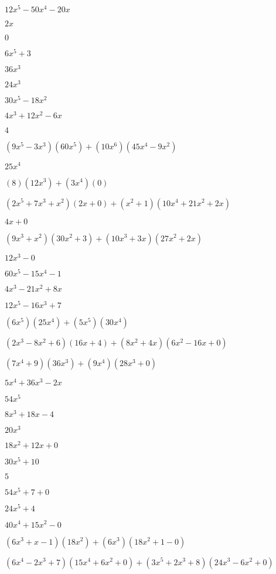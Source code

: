 \documentclass{article}
\begin{document}
\begin{multicols}{2}
$12x^{5}-50x^{4}-20x$\item $2x$\item $0$\item $6x^{5}+3$\item $36x^{3}$\item $24x^{3}$\item $30x^{5}-18x^{2}$\item $4x^{3}+12x^{2}-6x$\item $4$\item $(9x^{5}-3x^{3})(60x^{5})+(10x^{6})(45x^{4}-9x^{2})$\item $25x^{4}$\item $(8)(12x^{3})+(3x^{4})(0)$\item $(2x^{5}+7x^{3}+x^2)(2x+0)+(x^2+1)(10x^{4}+21x^{2}+2x)$\item $4x+0$\item $(9x^{3}+x^2)(30x^{2}+3)+(10x^{3}+3x)(27x^{2}+2x)$\item $12x^{3}-0$\item $60x^{5}-15x^{4}-1$\item $4x^{3}-21x^{2}+8x$\item $12x^{5}-16x^{3}+7$\item $(6x^{5})(25x^{4})+(5x^{5})(30x^{4})$\item $(2x^{3}-8x^2+6)(16x+4)+(8x^2+4x)(6x^{2}-16x+0)$\item $(7x^{4}+9)(36x^{3})+(9x^{4})(28x^{3}+0)$\item $5x^{4}+36x^{3}-2x$\item $54x^{5}$\item $8x^{3}+18x-4$\item $20x^{3}$\item $18x^{2}+12x+0$\item $30x^{5}+10$\item $5$\item $54x^{5}+7+0$\item $24x^{5}+4$\item $40x^{4}+15x^{2}-0$\item $(6x^{3}+x-1)(18x^{2})+(6x^{3})(18x^{2}+1-0)$\item $(6x^{4}-2x^{3}+7)(15x^{4}+6x^{2}+0)+(3x^{5}+2x^{3}+8)(24x^{3}-6x^{2}+0)$\ite
\end{multicols}
\end{document}

